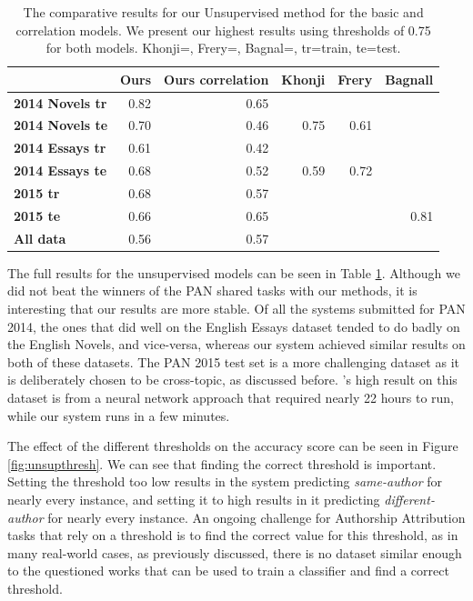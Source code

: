 \begin{table}[ht]
\caption{\label{tab:unsupres} The comparative results for our Unsupervised method for the basic and correlation models. We present our highest results using thresholds of 0.75 for both models. Khonji=\citet{khonji2014slightly}, Frery=\citet{frery2014identification}, Bagnal=\citet{bagnall2015author}, tr=train, te=test.}
\begin{center}
\begin{tabular}{lrrrrr} 
\toprule
                       &  \bf Ours & \bf Ours correlation & \bf   Khonji & \bf Frery & \bf Bagnall \\
\midrule
\bf 2014 Novels tr     &    0.82    & 0.65     &          &         &       \\
\bf 2014 Novels te     & 0.70       & 0.46     & 0.75     & 0.61   &       \\
\bf 2014 Essays tr     & 0.61       & 0.42     &          &         &       \\
\bf 2014 Essays te     &   0.68     & 0.52     &  0.59    &  0.72  &       \\
\bf 2015 tr            &   0.68     & 0.57     &          &         &       \\
\bf 2015 te            &    0.66    & 0.65     &          &         & 0.81  \\
\bf All data           &    0.56    & 0.57     &          &         &       \\
\bottomrule
\end{tabular}
\end{center}
\end{table}

The full results for the unsupervised models can be seen in Table \ref{tab:unsupres}. Although we did not beat the winners of the PAN shared tasks with our methods, it is interesting that our results are more stable. Of all the systems submitted for PAN 2014, the ones that did well on the English Essays dataset tended to do badly on the English Novels, and vice-versa, whereas our system achieved similar results on both of these datasets. The PAN 2015 test set is a more challenging dataset as it is deliberately chosen to be cross-topic, as discussed before. \citeauthor{bagnall2015author}'s 
high result on this dataset is from a neural network approach that required nearly 22 hours to run, 
while our system runs in a few minutes. 

The effect of the different thresholds on the accuracy score can be seen in Figure \ref{fig:unsupthresh}. We can see that finding the correct threshold is important. Setting the threshold too low results in the system predicting \textit{same-author} for nearly every instance, and setting it to high results in it predicting \textit{different-author} for nearly every instance. An ongoing challenge for Authorship Attribution tasks that rely on a threshold is to find the correct value for this threshold, as in many real-world cases, as previously discussed, there is no dataset similar enough to the questioned works that can be used to train a classifier and find a correct threshold.

